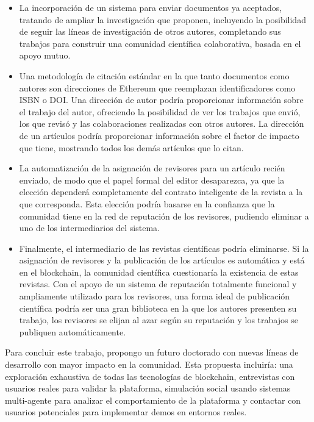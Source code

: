 \begin{itemize}
\item La incorporación de un sistema para enviar documentos ya aceptados,
  tratando de ampliar la investigación que proponen, incluyendo la posibilidad
  de seguir las líneas de investigación de otros autores, completando sus
  trabajos para construir una comunidad científica colaborativa, basada en el
  apoyo mutuo.
\item Una metodología de citación estándar en la que tanto documentos como
  autores son direcciones de Ethereum que reemplazan identificadores como ISBN o
  DOI. Una dirección de autor podría proporcionar información sobre el trabajo
  del autor, ofreciendo la posibilidad de ver los trabajos que envió, los que
  revisó y las colaboraciones realizadas con otros autores. La dirección de un
  artículos podría proporcionar información sobre el factor de impacto que
  tiene, mostrando todos los demás artículos que lo citan.
\item La automatización de la asignación de revisores para un artículo recién
  enviado, de modo que el papel formal del editor desaparezca, ya que la
  elección dependerá completamente del contrato inteligente de la revista a la
  que corresponda. Esta elección podría basarse en la confianza que la comunidad
  tiene en la red de reputación de los revisores, pudiendo eliminar a uno de los
  intermediarios del sistema.
\item Finalmente, el intermediario de las revistas científicas podría
  eliminarse. Si la asignación de revisores y la publicación de los artículos es
  automática y está en el blockchain, la comunidad científica cuestionaría la
  existencia de estas revistas. Con el apoyo de un sistema de reputación
  totalmente funcional y ampliamente utilizado para los revisores, una forma
  ideal de publicación científica podría ser una gran biblioteca en la que los
  autores presenten su trabajo, los revisores se elijan al azar según su
  reputación y los trabajos se publiquen automáticamente.
\end{itemize}

Para concluir este trabajo, propongo un futuro doctorado con nuevas líneas de
desarrollo con mayor impacto en la comunidad. Esta propuesta incluiría: una
exploración exhaustiva de todas las tecnologías de blockchain, entrevistas con
usuarios reales para validar la plataforma, simulación social usando sistemas
multi-agente para analizar el comportamiento de la plataforma y contactar con
usuarios potenciales para implementar demos en entornos reales.

